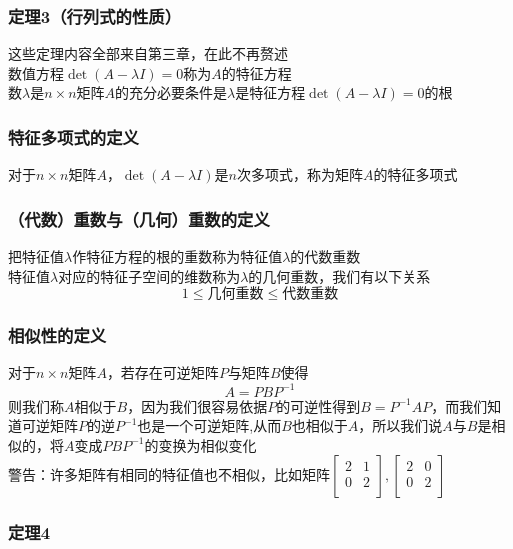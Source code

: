 \documentclass{article}
\begin{document}
\begin{CJK}{UTF8}{gkai}
\subsubsection{定理3（行列式的性质）}
这些定理内容全部来自第三章，在此不再赘述\\


数值方程$\det(A-\lambda I ) = 0$称为$A$的特征方程\\

数$\lambda$是$n\times n$矩阵$A$的充分必要条件是$\lambda$是特征方程$\det(A-\lambda I ) = 0$的根\\

\subsubsection{特征多项式的定义}
对于$n\times n$矩阵$A$，$\det(A-\lambda I)$是$n$次多项式，称为矩阵$A$的特征多项式\\

\subsubsection{（代数）重数与（几何）重数的定义}
把特征值$\lambda$作特征方程的根的重数称为特征值$\lambda$的代数重数\\

特征值$\lambda$对应的特征子空间的维数称为$\lambda$的几何重数，我们有以下关系
\[1\leq \text{几何重数} \leq \text{代数重数}\]

\subsubsection{相似性的定义}
对于$n\times n $矩阵$A$，若存在可逆矩阵$P$与矩阵$B$使得
\[A = P B P^{-1}\]
则我们称$A$相似于$B$，因为我们很容易依据$P$的可逆性得到$B = P^{-1} A P$，而我们知道可逆矩阵$P$的逆$P^{-1}$也是一个可逆矩阵,从而$B$也相似于$A$，所以我们说$A$与$B$是相似的，将$A$变成$PBP^{-1}$的变换为相似变化\\

警告：许多矩阵有相同的特征值也不相似，比如矩阵$\begin{bmatrix}2&1\\0&2\\\end{bmatrix},\begin{bmatrix}2&0\\0&2\\\end{bmatrix}$\\

\subsubsection{定理4}


\end{CJK}
\end{document}
